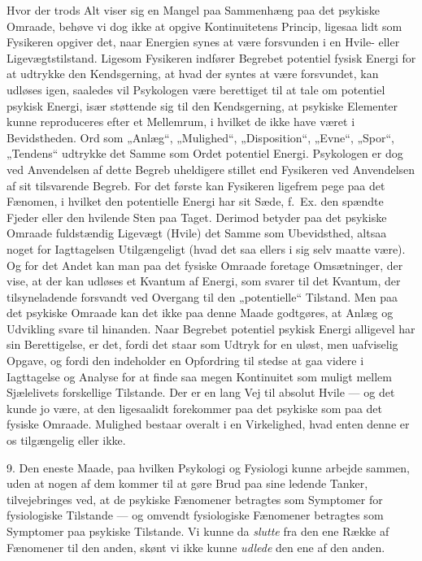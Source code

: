 \documentclass[12pt,a4paper]{book}
\newcommand{\apage}[1]{\marginnote{\footnotesize\textit{[#1]}}}
\begin{document}
Hvor der trods Alt viser sig en Mangel paa Sammenhæng paa det psykiske
Omraade, behøve vi dog ikke at opgive Kontinuitetens Princip, ligesaa
lidt som Fysikeren opgiver det, naar Energien synes at være forsvunden
i en Hvile- eller Ligevægtstilstand. Ligesom Fysikeren indfører
Begrebet potentiel fysisk Energi for at udtrykke den Kendsgerning, at
hvad der syntes at være forsvundet, kan udløses igen, saaledes vil
Psykologen være berettiget til at tale om potentiel psykisk Energi,
især støttende sig til den Kendsgerning, at psykiske Elementer kunne
reproduceres efter et Mellemrum, i hvilket de ikke have været i
Bevidstheden. Ord som „Anlæg“, „Mulighed“, „Disposition“, „Evne“,
„Spor“, „Tendens“ udtrykke det Samme som Ordet potentiel Energi.
Psykologen er dog ved Anvendelsen af dette Begreb uheldigere stillet
end Fysikeren ved Anvendelsen af sit tilsvarende Begreb. For det
første kan Fysikeren ligefrem pege paa det Fænomen, i hvilket den
potentielle Energi har sit Sæde, f.\ Ex. den spændte Fjeder eller den
hvilende Sten paa Taget. Derimod betyder paa det psykiske Omraade
fuldstændig Ligevægt (Hvile) det Samme som Ubevidsthed, altsaa noget
for Iagttagelsen Utilgængeligt (hvad det saa ellers i sig selv maatte
være). Og for det Andet kan man paa det fysiske Omraade foretage
Omsætninger, der vise, at der kan udløses et Kvantum af Energi, som
svarer til det Kvantum, der tilsyneladende forsvandt ved Overgang til
den „potentielle“ Tilstand. Men paa det psykiske Omraade kan det ikke
paa denne Maade godtgøres, at Anlæg og Udvikling svare til hinanden.
Naar Begrebet potentiel psykisk Energi alligevel har sin Berettigelse,
er det, fordi det staar som Udtryk for en uløst, men uafviselig
Opgave, og fordi den indeholder en Opfordring til stedse at gaa videre
i Iagttagelse og Analyse for at finde saa megen Kontinuitet som muligt
mellem Sjælelivets forskellige Tilstande. Der er en lang Vej til
absolut Hvile --- og det kunde jo være, at den ligesaalidt forekommer
paa det psykiske som \apage{31} paa det fysiske Omraade. Mulighed bestaar overalt
i en Virkelighed, hvad enten denne er os tilgængelig eller ikke.

9. Den eneste Maade, paa hvilken Psykologi og Fysiologi kunne arbejde
sammen, uden at nogen af dem kommer til at gøre Brud paa sine ledende
Tanker, tilvejebringes ved, at de psykiske Fænomener betragtes som
Symptomer for fysiologiske Tilstande --- og omvendt fysiologiske
Fænomener betragtes som Symptomer paa psykiske Tilstande. Vi kunne da
\emph{slutte} fra den ene Række af Fænomener til den anden, skønt vi
ikke kunne \emph{udlede} den ene af den anden.
\end{document}
